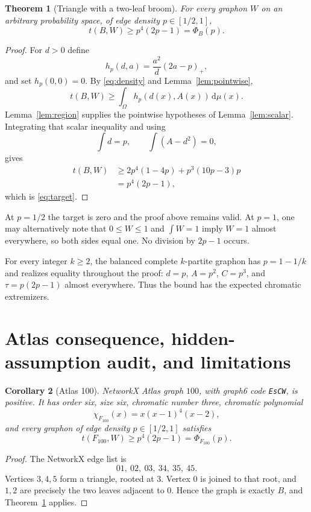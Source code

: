 \documentclass[11pt]{article}
\newtheorem{theorem}{Theorem}[section]
\newtheorem{corollary}[theorem]{Corollary}
\newcommand{\dd}{\,\mathrm d}
\begin{document}
\begin{theorem}[Triangle with a two-leaf broom]\label{thm:main}
For every graphon $W$ on an arbitrary probability space, of edge density
$p\in[1/2,1]$,
\[
 \boxed{t(B,W)\geq p^4(2p-1)=\Phi_B(p).}
\]
\end{theorem}

\begin{proof}
For $d>0$ define
\[
 h_p(d,a)=\frac{a^2}{d}(2a-p)_+,
\]
and set $h_p(0,0)=0$.  By \eqref{eq:density} and
Lemma~\ref{lem:pointwise},
\[
 t(B,W)\geq\int_\Omega h_p(d(x),A(x))\dd\mu(x).
\]
Lemma~\ref{lem:region} supplies the pointwise hypotheses of
Lemma~\ref{lem:scalar}.  Integrating that scalar inequality and using
\[
 \int d=p,
 \qquad
 \int(A-d^2)=0,
\]
gives
\begin{align*}
 t(B,W)
 &\geq2p^4(1-4p)+p^3(10p-3)p\\
 &=p^4(2p-1),
\end{align*}
which is \eqref{eq:target}.
\end{proof}

At $p=1/2$ the target is zero and the proof above remains valid.  At $p=1$,
one may alternatively note that $0\leq W\leq1$ and $\int W=1$ imply
$W=1$ almost everywhere, so both sides equal one.  No division by
$2p-1$ occurs.

For every integer $k\geq2$, the balanced complete $k$-partite graphon has
$p=1-1/k$ and realizes equality throughout the proof:
$d=p$, $A=p^2$, $C=p^3$, and
$\tau=p(2p-1)$ almost everywhere.  Thus the bound has the expected
chromatic extremizers.


\section{Atlas consequence, hidden-assumption audit, and limitations}

\begin{corollary}[Atlas 100]\label{cor:atlas100}
NetworkX Atlas graph $100$, with graph6 code \texttt{EsCW}, is positive.
It has order six, size six, chromatic number three, chromatic polynomial
\[
 \chi_{F_{100}}(x)=x(x-1)^4(x-2),
\]
and every graphon of edge density $p\in[1/2,1]$ satisfies
\[
 t(F_{100},W)\geq p^4(2p-1)=\Phi_{F_{100}}(p).
\]
\end{corollary}

\begin{proof}
The NetworkX edge list is
\[
 01,\ 02,\ 03,\ 34,\ 35,\ 45.
\]
Vertices $3,4,5$ form a triangle, rooted at $3$.  Vertex $0$ is joined to
that root, and $1,2$ are precisely the two leaves adjacent to $0$.  Hence
the graph is exactly $B$, and Theorem~\ref{thm:main} applies.
\end{proof}
\end{document}
